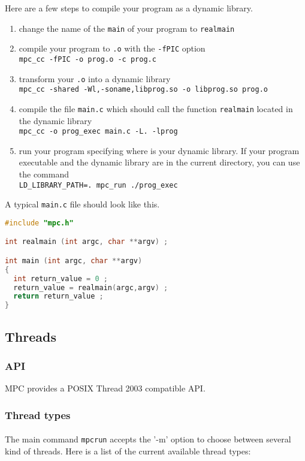 \documentclass[a4paper,11pt]{article}
\begin{document}
Here are a few steps to compile your program as a dynamic library.
\begin{enumerate}
\item change the name of the \texttt{main} of your program to \texttt{realmain}
\item compile your program to \texttt{.o} with the \texttt{-fPIC} option\\
\verb!mpc_cc -fPIC -o prog.o -c prog.c!
\item transform your \texttt{.o} into a dynamic library\\
\verb!mpc_cc -shared -Wl,-soname,libprog.so -o libprog.so prog.o!
\item compile the file \texttt{main.c} which should call the function \texttt{realmain} located
in the dynamic library\\
\verb!mpc_cc -o prog_exec main.c -L. -lprog!
\item run your program specifying where is your dynamic library. If your program
executable and the dynamic library are in the current directory, you can use the command\\
\verb!LD_LIBRARY_PATH=. mpc_run ./prog_exec!
\end{enumerate}

A typical \texttt{main.c} file should look like this.
\begin{lstlisting}[language=c]
#include "mpc.h"

int realmain (int argc, char **argv) ;

int main (int argc, char **argv)
{
  int return_value = 0 ;
  return_value = realmain(argc,argv) ;
  return return_value ;
}
\end{lstlisting}

\subsection{Threads}

\subsubsection{API}
MPC provides a POSIX Thread 2003 compatible API.

\subsubsection{Thread types}

\paragraph{}
The main command \texttt{mpcrun} accepts the '-m' option to choose between several kind of threads.
Here is a list of the current available thread types:
\end{document}
